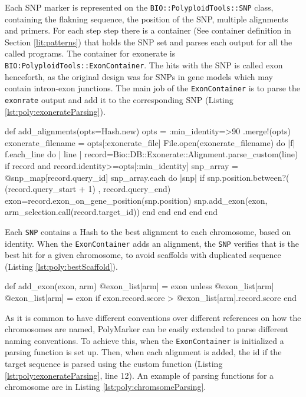 Each SNP marker is represented on the \verb|BIO::PolyploidTools::SNP| class, containing the flakning sequence, the position of the SNP, multiple alignments and primers. 
For each step step there is a container (See container definition in Section \ref{lit:patterns}) that holds the SNP set and parses each output for all the called programs. 
The container for exonerate is \verb|BIO:PolyploidTools::ExonContainer|. 
The hits with the SNP is called exon henceforth, as the original design was for SNPs in gene models which may contain intron-exon junctions. 
The main job of the \verb|ExonContainer| is to parse the \verb|exonrate| output and add it to the corresponding SNP (Listing \ref{lst:poly:exonerateParsing}). 

\begin{code}[language=Ruby,caption=Method in \texttt{BIO::PolyploidTools::ExonContainer} that adds to each SNP object the alignments, label=lst:poly:exonerateParsing]
def add_alignments(opts=Hash.new) 
  opts = {:min_identity=>90 }.merge!(opts)
  exonerate_filename = opts[:exonerate_file]
  File.open(exonerate_filename) do |f|
    f.each_line do | line |
      record=Bio::DB::Exonerate::Alignment.parse_custom(line)
      if record and record.identity>=opts[:min_identity]
        snp_array = @snp_map[record.query_id]
        snp_array.each do |snp|                            
        if snp.position.between?( (record.query_start + 1) , record.query_end)
          exon=record.exon_on_gene_position(snp.position)
          snp.add_exon(exon, arm_selection.call(record.target_id))
        end
      end
    end
  end
end
\end{code}

Each \verb|SNP| contains a Hash to the best alignment to each chromosome, based on identity. 
When the \verb|ExonContainer| adds an alignment, the \verb|SNP| verifies that is the best hit for a given chromosome, to avoid scaffolds with duplicated sequence (Listing \ref{lst:poly:bestScaffold}).

\begin{code}[language=Ruby,caption=Method in \texttt{BIO::PolyploidTools::SNP} that adds an alignment , label=lst:poly:bestScaffold]
def add_exon(exon, arm)
  @exon_list[arm] = exon unless @exon_list[arm]
 @exon_list[arm] = exon if exon.record.score > @exon_list[arm].record.score
end
\end{code}

As it is common to have different conventions over different references on how the chromosomes are named, PolyMarker can be easily extended to parse different naming conventions. 
To achieve this, when the \verb|ExonContainer| is initialized a parsing function is set up. 
Then, when each alignment is added, the id if the target sequence is parsed using the custom function (Listing \ref{lst:poly:exonerateParsing}, line 12).
An example of parsing functions for a chromosome are in Listing \ref{lst:poly:chromsomeParsing}.


